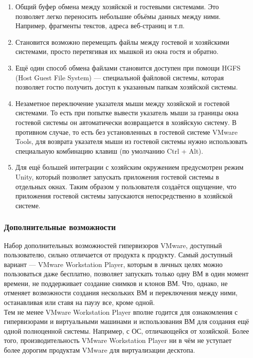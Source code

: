 \documentclass[14pt, a4paper]{article}
\begin{document}
\begin{enumerate}
    \item Общий буфер обмена между хозяйской и гостевыми системами. Это позволяет легко
    переносить небольшие объёмы данных между ними. Например, фрагменты текстов, адреса
    веб-страниц и т.п.
    \item Становится возможно перемещать файлы между гостевой и хозяйскими системами, просто
    перетягивая их мышкой из окна гостя и обратно.
    \item Ещё один способ обмена файлами становится доступен при помощи HGFS (Host Guest File
    System) — специальной файловой системы, которая позволяет гостю получить доступ к
    указанным папкам хозяйской системы.
    \item Незаметное переключение указателя мыши между хозяйской и гостевой системами. То есть
    при попытке вывести указатель мыши за границы окна гостевой системы он автоматически
    возвращается в хозяйскую систему. В противном случае, то есть без установленных в гостевой 
    системе VMware Tools, для возврата указателя мыши из гостевой системы нужно использовать
    специальную комбинацию клавиш (по умолчанию Ctrl + Alt).
    \item Для ещё большей интеграции с хозяйским окружением предусмотрен режим Unity, который
    позволяет запускать приложения гостевой системы в отдельных окнах. Таким образом у
    пользователя создаётся ощущение, что приложения гостевой системы запускаются
    непосредственно в хозяйской системе.
\end{enumerate}

\subsubsection*{Дополнительные возможности}

Набор дополнительных возможностей гипервизоров VMware, доступный пользователю, сильно
отличается от продукта к продукту. Самый доступный вариант — VMware Workstation Player, которым в
личных целях можно пользоваться даже бесплатно, позволяет запускать только одну ВМ в один
момент времени, не поддерживает создание снимков и клонов ВМ. Что, однако, не отменяет
возможности создания нескольких ВМ и переключения между ними, останавливая или ставя на паузу
все, кроме одной.\\

Тем не менее VMware Workstation Player вполне годится для ознакомления с гипервизорами и
виртуальными машинами и использования ВМ для создания ещё одной полноценной системы.
Например, с ОС, отличающейся от хозяйской. Более того, производительность VMware Workstation
Player ни в чём не уступает более дорогим продуктам VMware для виртуализации десктопа.\\
\end{document}
